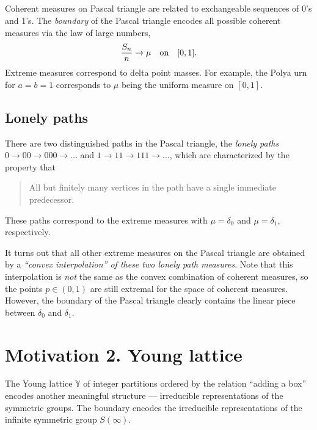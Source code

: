 \documentclass[letterpaper,11pt,oneside,reqno]{article}
\numberwithin{equation}{section}
\theoremstyle{definition}
\begin{document}
\subsection{}

Coherent measures on Pascal triangle are related to exchangeable
sequences of 0's and 1's. The \emph{boundary} of the Pascal
triangle encodes all possible coherent measures via the law of large numbers,
\begin{equation*}
	\frac{S_n}{n}\to \mu \quad \textnormal{on} \quad [0,1].
\end{equation*}
Extreme measures correspond to delta point masses.
For example, the Polya urn for $a=b=1$ corresponds to $\mu$ being the
uniform measure on $[0,1]$.

\subsection{Lonely paths}

There are two distinguished paths in the Pascal triangle, the
\emph{lonely paths} $0\to00\to000\to\ldots $
and
$1\to 11\to111\to\ldots $, which are characterized by the
property that \cite{KerovGoodman1997}
\begin{quote}
	All but finitely many vertices in the path have a single immediate predecessor.
\end{quote}
These paths correspond to the extreme measures
with $\mu=\delta_0$ and $\mu=\delta_1$, respectively.

It turns out that all other extreme measures on the Pascal triangle
are obtained by a \emph{``convex interpolation'' of these two lonely path measures}.
Note that this interpolation is \emph{not} the same as the convex combination
of coherent measures, so the points $p\in(0,1)$ are still extremal
for the space of coherent measures. However, the boundary
of the Pascal triangle clearly contains the linear
piece between $\delta_0$ and $\delta_1$.


\section{Motivation 2. Young lattice}

The Young lattice $\mathbb{Y}$ of integer partitions ordered
by the relation ``adding a box''
encodes another meaningful structure --- irreducible representations of the symmetric groups.
The boundary encodes the irreducible representations of the infinite symmetric group $S(\infty)$.
\end{document}
